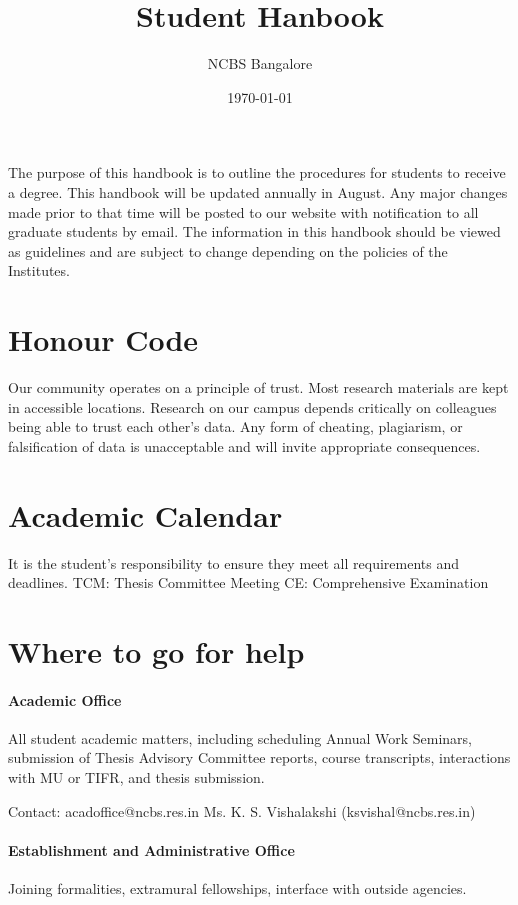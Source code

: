 \documentclass[a4paper,10pt]{article}
\author{NCBS Bangalore}
\title{Student Hanbook}
\date{\today}
\begin{document}
\maketitle

The purpose of this handbook is to outline the procedures for students to receive a degree.
This handbook will be updated annually in August. Any major changes made prior to that
time will be posted to our website with notification to all graduate students by email. The
information in this handbook should be viewed as guidelines and are subject to change
depending on the policies of the Institutes.


\section*{Honour Code}
Our community operates on a principle of trust. Most research materials are kept
in accessible locations. Research on our campus depends critically on colleagues
being able to trust each other’s data.  Any form of cheating, plagiarism, or
falsification of data is unacceptable and will invite appropriate consequences.


\newpage
\section*{Academic Calendar}

It is the student’s responsibility to ensure they meet all requirements and
deadlines.  TCM: Thesis Committee Meeting CE: Comprehensive Examination

\newpage
\section*{Where to go for help}

\paragraph{Academic Office} All student academic matters, including scheduling
Annual Work Seminars, submission of Thesis Advisory Committee reports, course
transcripts, interactions with MU or TIFR, and thesis submission.

Contact: acadoffice@ncbs.res.in
Ms. K. S. Vishalakshi (ksvishal@ncbs.res.in)

\paragraph{Establishment and Administrative Office}
Joining formalities, extramural fellowships, interface with outside agencies.
\end{document}
